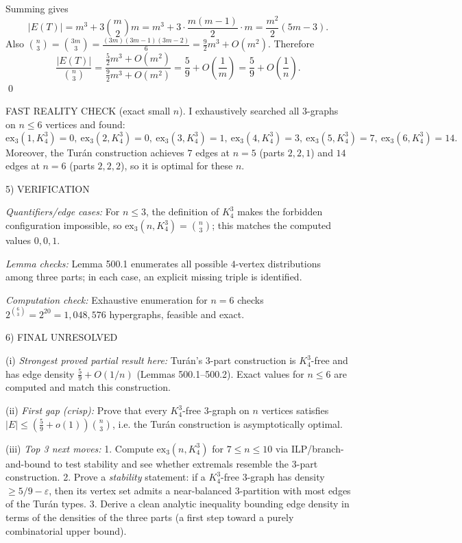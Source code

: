 Summing gives
\[
\lvert E(T)\rvert = m^3 + 3\binom{m}{2}m = m^3 + 3\cdot \frac{m(m-1)}{2}\cdot m = \frac{m^2}{2}(5m-3).
\]
Also $\binom{n}{3}=\binom{3m}{3} = \frac{(3m)(3m-1)(3m-2)}{6} = \frac{9}{2}m^3 + O(m^2)$.
Therefore
\[
\frac{\lvert E(T)\rvert}{\binom{n}{3}}
= \frac{\frac{5}{2}m^3 + O(m^2)}{\frac{9}{2}m^3 + O(m^2)}
= \frac{5}{9} + O\left(\frac{1}{m}\right)
= \frac{5}{9} + O\left(\frac{1}{n}\right).
\]
\qed

FAST REALITY CHECK (exact small $n$).
I exhaustively searched all $3$-graphs on $n\le 6$ vertices and found:
\[
\mathrm{ex}_3(1,K_4^3)=0,\ \mathrm{ex}_3(2,K_4^3)=0,\ \mathrm{ex}_3(3,K_4^3)=1,\ \mathrm{ex}_3(4,K_4^3)=3,\ \mathrm{ex}_3(5,K_4^3)=7,\ \mathrm{ex}_3(6,K_4^3)=14.
\]
Moreover, the Tur\'an construction achieves $7$ edges at $n=5$ (parts $2,2,1$) and $14$ edges at $n=6$ (parts $2,2,2$), so it is optimal for these $n$.

5) VERIFICATION

\emph{Quantifiers/edge cases:} For $n\le 3$, the definition of $K_4^3$ makes the forbidden configuration impossible, so $\mathrm{ex}_3(n,K_4^3)=\binom{n}{3}$; this matches the computed values $0,0,1$.

\emph{Lemma checks:} Lemma 500.1 enumerates all possible $4$-vertex distributions among three parts; in each case, an explicit missing triple is identified.

\emph{Computation check:} Exhaustive enumeration for $n=6$ checks $2^{\binom{6}{3}}=2^{20}=1{,}048{,}576$ hypergraphs, feasible and exact.

6) FINAL
UNRESOLVED

(i) \emph{Strongest proved partial result here:} Tur\'an's 3-part construction is $K_4^3$-free and has edge density $\frac{5}{9}+O(1/n)$ (Lemmas 500.1--500.2). Exact values for $n\le 6$ are computed and match this construction.

(ii) \emph{First gap (crisp):} Prove that every $K_4^3$-free $3$-graph on $n$ vertices satisfies $\lvert E\rvert \le \left(\frac{5}{9}+o(1)\right)\binom{n}{3}$, i.e. the Tur\'an construction is asymptotically optimal.

(iii) \emph{Top 3 next moves:}
1. Compute $\mathrm{ex}_3(n,K_4^3)$ for $7\le n\le 10$ via ILP/branch-and-bound to test stability and see whether extremals resemble the 3-part construction.
2. Prove a \emph{stability} statement: if a $K_4^3$-free $3$-graph has density $\ge 5/9-\varepsilon$, then its vertex set admits a near-balanced 3-partition with most edges of the Tur\'an types.
3. Derive a clean analytic inequality bounding edge density in terms of the densities of the three parts (a first step toward a purely combinatorial upper bound).

